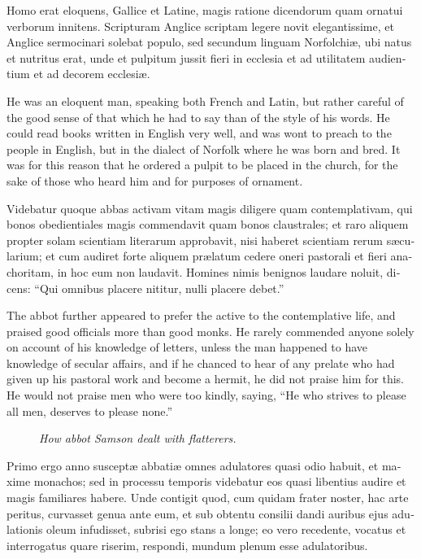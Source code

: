 \documentclass{book}
\newcommand{\blockhead}[4][]{
\begin{figure}
\centering
\vspace{#4}
\parbox{2.75cm}{\begin{center}\footnotesize \color{BrickRed} \emph{#2}\\ #1 \end{center}}
\end{figure}
}
\begin{document}
\begin{paracol}{2}
\switchcolumn*

\begin{otherlanguage}{latin}
Homo erat eloquens, Gallice et Latine, magis ratione dicendorum quam ornatui verborum innitens. Scripturam Anglice scriptam legere novit elegantissime, et Anglice sermocinari solebat populo, sed secundum linguam Norfolchi\ae{}, ubi natus et nutritus erat, unde et pulpitum jussit fieri in ecclesia et ad utilitatem audientium et ad decorem ecclesi\ae{}.
\end{otherlanguage}

\switchcolumn

He was an eloquent man, speaking both French and Latin, but rather careful of the good sense of that which he had to say than of the style of his words. He could read books written in English very well, and was wont to preach to the people in English, but in the dialect of Norfolk where he was born and bred. It was for this reason that he ordered a pulpit to be placed in the church, for the sake of those who heard him and for purposes of ornament.

\switchcolumn*

\begin{otherlanguage}{latin}
Videbatur quoque abbas activam vitam magis diligere quam contemplativam, qui bonos obedientiales magis commendavit quam bonos claustrales; et raro aliquem propter solam scientiam literarum approbavit, nisi haberet scientiam rerum s\ae{}cularium; et cum audiret forte aliquem pr\ae{}latum cedere oneri pastorali et fieri anachoritam, in hoc eum non laudavit. Homines nimis benignos laudare noluit, dicens: ``Qui omnibus placere nititur, nulli placere debet.''
\end{otherlanguage}

\switchcolumn

The abbot further appeared to prefer the active to the contemplative life, and praised good officials more than good monks. He rarely commended anyone solely on account of his knowledge of letters, unless the man happened to have knowledge of secular affairs, and if he chanced to hear of any prelate who had given up his pastoral work and become a hermit, he did not praise him for this. He would not praise men who were too kindly, saying, ``He who strives to please all men, deserves to please none.''

\switchcolumn*

\begin{otherlanguage}{latin}
\blockhead{How abbot Samson dealt with flatterers.}{3}{-0.55cm}
Primo ergo anno suscept\ae{} abbati\ae{} omnes adulatores quasi odio habuit, et maxime monachos; sed in processu temporis videbatur eos quasi libentius audire et magis familiares habere. Unde contigit quod, cum quidam frater noster, hac arte peritus, curvasset genua ante eum, et sub obtentu consilii dandi auribus ejus adulationis oleum infudisset, subrisi ego stans a longe; eo vero recedente, vocatus et interrogatus quare riserim, respondi, mundum plenum esse adulatoribus.


\end{otherlanguage}
\end{paracol}
\end{document}
